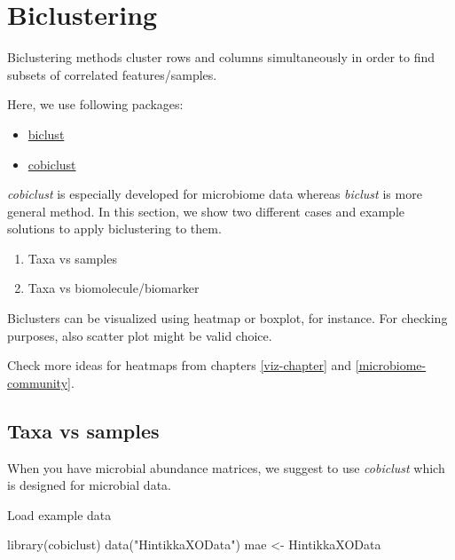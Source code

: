 \documentclass[
]{book}
\newenvironment{Shaded}{\begin{snugshade}}{\end{snugshade}}
\newcommand{\FunctionTok}[1]{\textcolor[rgb]{0.00,0.00,0.00}{#1}}
\newcommand{\NormalTok}[1]{#1}
\newcommand{\OtherTok}[1]{\textcolor[rgb]{0.56,0.35,0.01}{#1}}
\newcommand{\StringTok}[1]{\textcolor[rgb]{0.31,0.60,0.02}{#1}}
\providecommand{\tightlist}{%
  \setlength{\itemsep}{0pt}\setlength{\parskip}{0pt}}
\begin{document}
\hypertarget{biclustering}{%
\section{Biclustering}\label{biclustering}}

Biclustering methods cluster rows and columns simultaneously in order
to find subsets of correlated features/samples.

Here, we use following packages:

\begin{itemize}
\tightlist
\item
  \href{https://cran.r-project.org/web/packages/biclust/index.html}{biclust}
\item
  \href{https://besjournals.onlinelibrary.wiley.com/doi/abs/10.1111/2041-210X.13582}{cobiclust}
\end{itemize}

\emph{cobiclust} is especially developed for microbiome data whereas \emph{biclust} is more
general method. In this section, we show two different cases and example
solutions to apply biclustering to them.

\begin{enumerate}
\def\labelenumi{\arabic{enumi}.}
\tightlist
\item
  Taxa vs samples
\item
  Taxa vs biomolecule/biomarker
\end{enumerate}

Biclusters can be visualized using heatmap or boxplot, for
instance. For checking purposes, also scatter plot might be valid
choice.

Check more ideas for heatmaps from chapters \ref{viz-chapter} and
\ref{microbiome-community}.

\hypertarget{taxa-vs-samples}{%
\subsection{Taxa vs samples}\label{taxa-vs-samples}}

When you have microbial abundance matrices, we suggest to use
\emph{cobiclust} which is designed for microbial data.

Load example data

\begin{Shaded}
\begin{Highlighting}[]
\FunctionTok{library}\NormalTok{(cobiclust)}
\FunctionTok{data}\NormalTok{(}\StringTok{"HintikkaXOData"}\NormalTok{)}
\NormalTok{mae }\OtherTok{\textless{}{-}}\NormalTok{ HintikkaXOData}
\end{Highlighting}
\end{Shaded}
\end{document}

